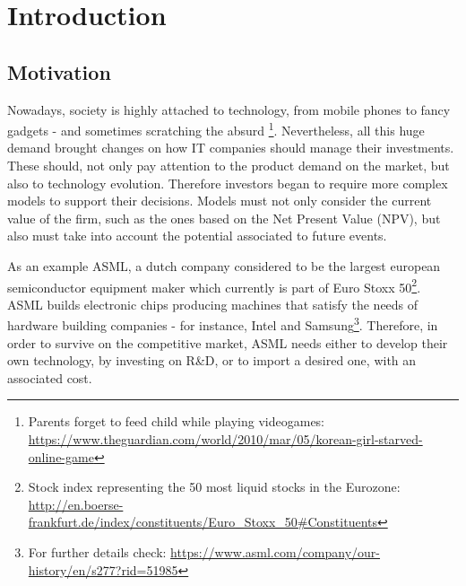 
\chapter{Introduction}
\label{chapter:introduction}


\section{Motivation}
\label{section:motivation}

Nowadays, society is highly attached to technology, from mobile phones to fancy gadgets - and sometimes scratching the absurd
\footnote{Parents forget to feed child while playing videogames:\\
\url{https://www.theguardian.com/world/2010/mar/05/korean-girl-starved-online-game} }.
 Nevertheless, all this huge demand brought changes on how IT companies should manage their investments. These should, not only pay attention to the product demand on the market, but also to technology evolution. Therefore investors began to require more complex models to support their decisions. Models must not only consider the current value of the firm, such as the ones based on the Net Present Value (NPV), but also must take into account the potential associated to future events.

As an example ASML, a dutch company considered to be the largest european semiconductor equipment maker which currently is part of Euro Stoxx 50\footnote{Stock index representing the 50 most liquid stocks in the Eurozone:\\  \url{http://en.boerse-frankfurt.de/index/constituents/Euro_Stoxx_50\#Constituents} }.
ASML builds electronic chips producing machines that satisfy the needs of hardware building companies - for instance, Intel and Samsung\footnote{For further details check: \url{https://www.asml.com/company/our-history/en/s277?rid=51985}}.
Therefore, in order to survive on the competitive market, ASML needs either to develop their own technology, by investing on R\&D, or to import a desired one, with an associated cost.

